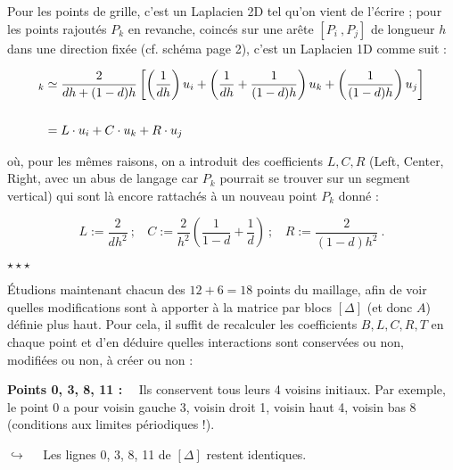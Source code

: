 \documentclass[12pt]{article}
\begin{document}
\noindent
Pour les points de grille, c'est un Laplacien 2D tel qu'on vient de l'écrire ; pour les points rajoutés $P_k$ en revanche, coincés sur une arête $[P_i~,P_j]$ de longueur $h$ dans une direction fixée (cf. schéma page 2), c'est un Laplacien 1D comme suit :

\begin{align*}
[\Delta u]_k &\simeq \frac{2}{dh + (1-d)h} \left[ \left( \frac{1}{dh} \right)u_i + \left( \frac{1}{dh} + \frac{1}{(1-d)h} \right)u_k + \left( \frac{1}{(1-d)h} \right)u_j \right] \\
& \vspace{5 mm} \\
&= L \cdot u_i + C \cdot u_k + R \cdot u_j
\end{align*}

\vspace{5 mm}

\noindent
où, pour les mêmes raisons, on a introduit des coefficients $L,C,R$ (Left, Center, Right, avec un abus de langage car $P_k$ pourrait se trouver sur un segment vertical) qui sont là encore rattachés à un nouveau point $P_k$ donné :

$$L := \frac{2}{dh^2}~;~~~~ C := \frac{2}{h^2} \left(\frac{1}{1-d} + \frac{1}{d} \right)~;~~~~ R := \frac{2}{(1-d)h^2}~.$$

\vspace{10 mm}

\begin{center}
$\star \star \star$
\end{center}

\vspace{5 mm}

\noindent
Étudions maintenant chacun des $12 + 6 = 18$ points du maillage, afin de voir quelles modifications sont à apporter à la matrice par blocs $[\Delta]$ (et donc $A$) définie plus haut. Pour cela, il suffit de recalculer les coefficients $B,L,C,R,T$ en chaque point et d'en déduire quelles interactions sont conservées ou non, modifiées ou non, à créer ou non :

\vspace{5 mm}

\noindent
\textbf{Points 0, 3, 8, 11 :}~~ Ils conservent tous leurs 4 voisins initiaux. Par exemple, le point 0 a pour voisin gauche 3, voisin droit 1, voisin haut 4, voisin bas 8 (conditions aux limites périodiques !).

\vspace{5 mm}

$\hookrightarrow$~~ Les lignes 0, 3, 8, 11 de $[\Delta]$ restent identiques.
\end{document}
